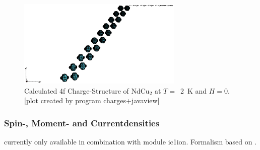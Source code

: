 \begin{figure}[hb]%
\begin{center}\leavevmode
\includegraphics[angle=0, width=0.7\textwidth]{../examples/ndcu2b/resultss/chargesab.eps}
\end{center}
\caption{Calculated 4f Charge-Structure of NdCu$_2$ at $T=$~2~K and $H=0$.
[plot created by program {\prg charges+javaview}]}
\label{chargegraphic}
\end{figure}

\subsubsection{Spin-, Moment- and Currentdensities}

currently only available in combination with module {\prg ic1ion}.
Formalism based on \cite{balcar75-1581,balcar89-1}.

